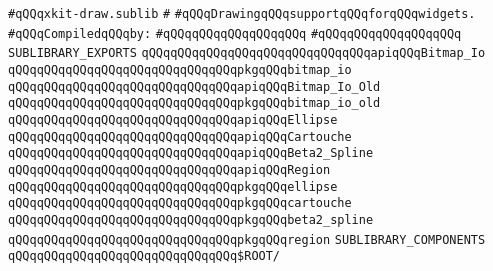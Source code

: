 \label{src/lib/x-kit/draw/xkit-draw.sublib}
\verb|#qQQqxkit-draw.sublib|\newline
\verb|#|\newline
\verb|#qQQqDrawingqQQqsupportqQQqforqQQqwidgets.|\newline
\newline
\verb|#qQQqCompiledqQQqby:|\newline
\verb|#qQQqqQQqqQQqqQQqqQQq|\newline
\verb|#qQQqqQQqqQQqqQQqqQQq|\newline
\newline
\verb|SUBLIBRARY_EXPORTS|\newline
\newline
\verb|qQQqqQQqqQQqqQQqqQQqqQQqqQQqqQQqapiqQQqBitmap_Io|\newline
\verb|qQQqqQQqqQQqqQQqqQQqqQQqqQQqqQQqpkgqQQqbitmap_io|\newline
\newline
\verb|qQQqqQQqqQQqqQQqqQQqqQQqqQQqqQQqapiqQQqBitmap_Io_Old|\newline
\verb|qQQqqQQqqQQqqQQqqQQqqQQqqQQqqQQqpkgqQQqbitmap_io_old|\newline
\newline
\verb|qQQqqQQqqQQqqQQqqQQqqQQqqQQqqQQqapiqQQqEllipse|\newline
\verb|qQQqqQQqqQQqqQQqqQQqqQQqqQQqqQQqapiqQQqCartouche|\newline
\verb|qQQqqQQqqQQqqQQqqQQqqQQqqQQqqQQqapiqQQqBeta2_Spline|\newline
\verb|qQQqqQQqqQQqqQQqqQQqqQQqqQQqqQQqapiqQQqRegion|\newline
\newline
\verb|qQQqqQQqqQQqqQQqqQQqqQQqqQQqqQQqpkgqQQqellipse|\newline
\verb|qQQqqQQqqQQqqQQqqQQqqQQqqQQqqQQqpkgqQQqcartouche|\newline
\verb|qQQqqQQqqQQqqQQqqQQqqQQqqQQqqQQqpkgqQQqbeta2_spline|\newline
\verb|qQQqqQQqqQQqqQQqqQQqqQQqqQQqqQQqpkgqQQqregion|\newline
\newline
\verb|SUBLIBRARY_COMPONENTS|\newline
\newline
\verb|qQQqqQQqqQQqqQQqqQQqqQQqqQQqqQQq$ROOT/|\newline
